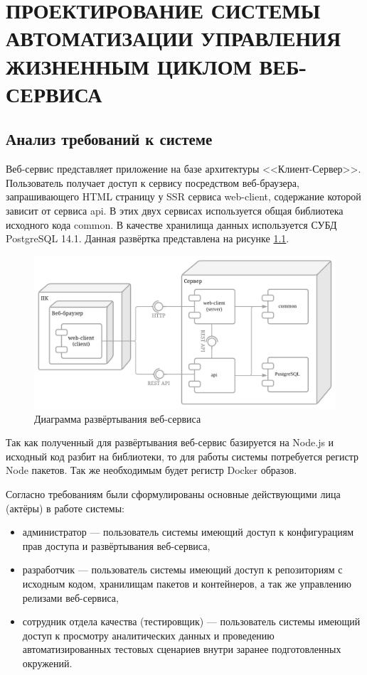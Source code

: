 \chapter{ПРОЕКТИРОВАНИЕ СИСТЕМЫ АВТОМАТИЗАЦИИ УПРАВЛЕНИЯ ЖИЗНЕННЫМ ЦИКЛОМ ВЕБ-СЕРВИСА}
\label{cha:design}

\section{Анализ требований к системе}

Веб-сервис представляет приложение на базе архитектуры <<Клиент-Сервер>>.
Пользователь получает доступ к сервису посредством веб-браузера, запрашивающего HTML страницу у SSR сервиса web-client,
содержание которой зависит от сервиса api.
В этих двух сервисах используется общая библиотека исходного кода common.
В качестве хранилища данных используется СУБД PostgreSQL 14.1.
Данная развёртка представлена на рисунке \ref{fig:deploy-diagram}.

\begin{figure}[ht]
    \centering
    \includegraphics[scale=0.225]{src/figures/deploy-diagram}
    \caption{Диаграмма развёртывания веб-сервиса}
    \label{fig:deploy-diagram}
\end{figure}

Так как полученный для развёртывания веб-сервис базируется на Node.js и исходный код разбит на библиотеки, то для работы системы потребуется регистр Node пакетов.
Так же необходимым будет регистр Docker образов.

Согласно требованиям были сформулированы основные действующими лица (актёры) в работе системы:
\begin{itemize}
    \item администратор --- пользователь системы имеющий доступ к конфигурациям прав доступа
        и развёртывания веб-сервиса,
    \item разработчик --- пользователь системы имеющий доступ к репозиториям с исходным кодом,
        хранилищам пакетов и контейнеров, а так же управлению релизами веб-сервиса,
    \item сотрудник отдела качества (тестировщик) --- пользователь системы имеющий доступ к просмотру аналитических данных и
        проведению автоматизированных тестовых сценариев внутри заранее подготовленных окружений.
\end{itemize}

